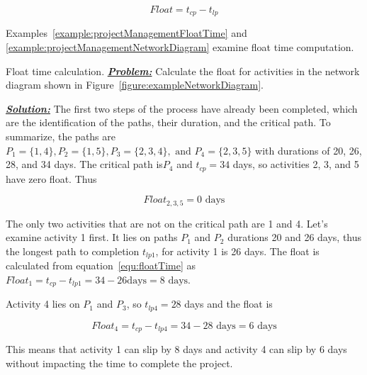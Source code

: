 \begin{equation}
\label{equ:floatTime}
Float = t_{cp} - t_{lp}
\end{equation}



Examples~\ref{example:projectManagementFloatTime} and 
\ref{example:projectManagementNetworkDiagram} examine float time computation.

\begin{example}{ Float time calculation.}
\label{example:projectManagementFloatTime}
\emph{\textbf{\ul{Problem:}}} Calculate the float for activities in the
network diagram shown in Figure~\ref{figure:exampleNetworkDiagram}.

\emph{\textbf{\ul{Solution:}}} The first two steps of the process have
already been completed, which are the identification of the paths, their
duration, and the critical path. To summarize, the paths are
$P_1 = \{1,4\}, P_2=\{1,5\}, P_3 =\{2,3,4\}, \text{ and } P_4 =\{2,3,5\}$
with durations of 20, 26, 28, and 34 days. The critical path is$P_4$
and $t_{cp}=34$ days, so activities 2, 3, and 5 have zero float. Thus

$$Float_{2,3,5} = 0 \text{ days}$$

The only two activities that are not on the critical path are 1 and 4.
Let's examine activity 1 first. It lies on paths $P_1$ and $P_2$
durations 20 and 26 days, thus the longest path to completion
$t_{lp1}$, for activity 1 is 26 days. The float is calculated from 
equation~\ref{equ:floatTime} as 
$Float_{1} =t_{cp} - t_{lp1} = 34-26 \text{days} = 8 \text{ days}$.

Activity 4 lies on $P_1$ and $P_3$, so $t_{lp4} = 28$ days and the float is

$$Float_{4} = t_{cp} - t_{lp4} = 34 -28 \text{ days} = 6 \text{ days}$$

This means that activity 1 can slip by 8 days and activity 4 can slip by
6 days without impacting the time to complete the project.
\end{example}

